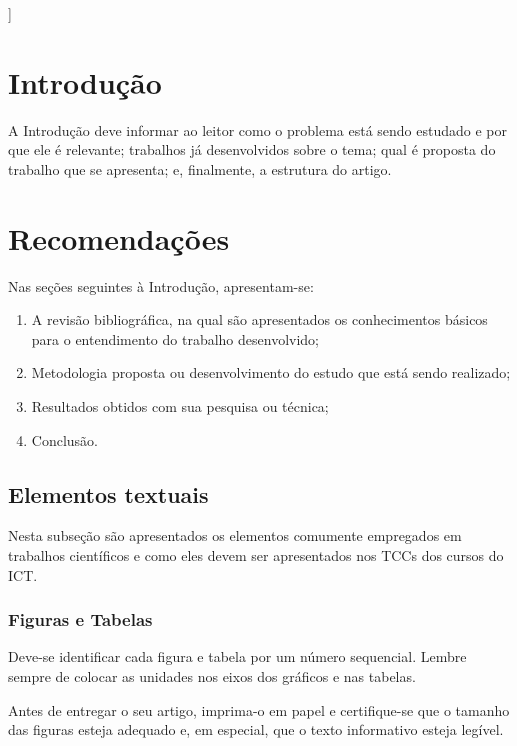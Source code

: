 \documentclass[conference,harvard,brazil,english]{icttcc}
\begin{document}
]


\section{Introdução}

A Introdução deve informar ao leitor como o problema está sendo estudado e por que ele é relevante; trabalhos já desenvolvidos sobre o tema; qual é proposta do trabalho que se apresenta; e, finalmente, a estrutura do artigo.

\section{Recomendações}

Nas seções seguintes à Introdução, apresentam-se:

\begin{enumerate}[label=(\alph*)]
\item A revisão bibliográfica, na qual são apresentados os conhecimentos básicos para o entendimento do trabalho desenvolvido;

\item Metodologia proposta ou desenvolvimento do estudo que está sendo realizado;

\item Resultados obtidos com sua pesquisa ou técnica;

\item Conclusão.
\end{enumerate} 



\subsection{Elementos textuais}
Nesta subseção são apresentados os elementos comumente empregados em trabalhos científicos e como eles devem ser apresentados nos TCCs dos cursos do ICT.

\subsubsection {Figuras e Tabelas}
Deve-se identificar cada figura e tabela por um número sequencial. Lembre sempre de colocar as unidades nos eixos dos gráficos e nas tabelas.

Antes de entregar o seu artigo, imprima-o em papel e certifique-se que o tamanho das figuras esteja adequado e, em especial, que o texto informativo esteja legível.
\end{document}
